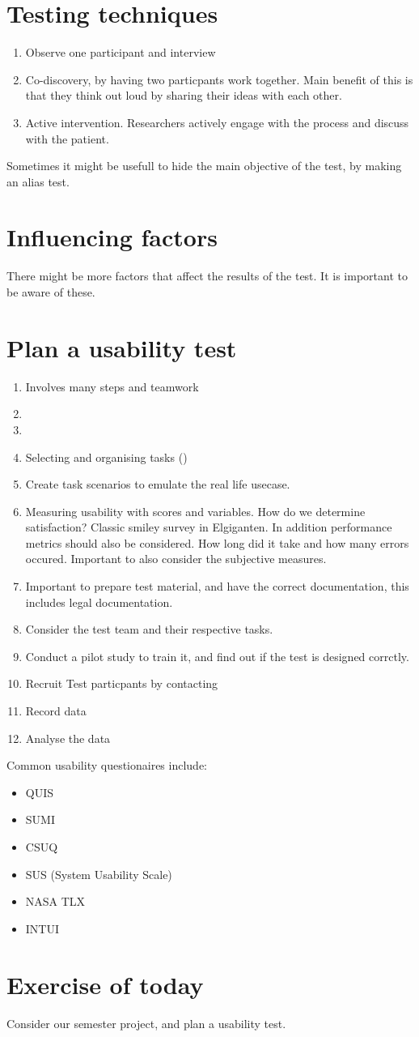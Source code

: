 \documentclass[a4paper]{article}
\begin{document}
\section{Testing techniques}
\begin{enumerate}
	\item Observe one participant and interview
	\item Co-discovery, by having two particpants work together. Main benefit of this is that they think out loud by sharing their ideas with each other. 
	\item Active intervention. Researchers actively engage with the process and discuss with the patient. 
\end{enumerate}

Sometimes it might be usefull to hide the main objective of the test, by making an alias test.


\section{Influencing factors}
There might be more factors that affect the results of the test. It is important to be aware of these. 


\section{Plan a usability test}
\begin{enumerate}
	\item Involves many steps and teamwork
	\item 
	\item 
	\item Selecting and organising tasks ()
	\item Create task scenarios to emulate the real life usecase. 
	\item Measuring usability with scores and variables. How do we determine satisfaction? Classic smiley survey in Elgiganten. In addition performance metrics should also be considered. How long did it take and how many errors occured. Important to also consider the subjective measures.
	\item Important to prepare test material, and have the correct documentation, this includes legal documentation.
	\item Consider the test team and their respective tasks. 
	\item Conduct a pilot study to train it, and find out if the test is designed corrctly. 
	\item Recruit Test particpants by contacting
	\item Record data
	\item Analyse the data
\end{enumerate}

Common usability questionaires include:
\begin{itemize}
	\item QUIS
	\item SUMI
	\item CSUQ
	\item SUS (System Usability Scale)
	\item NASA TLX
	\item INTUI
\end{itemize}

\section{Exercise of today}
Consider our semester project, and plan a usability test. 
\end{document}

